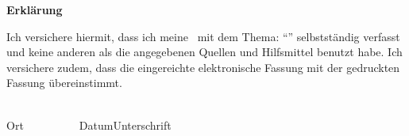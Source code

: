 
\newpage
\thispagestyle{empty}
\begin{framed}
\begin{center}
\Large\bfseries Erklärung
\end{center}
\medskip
\noindent
Ich versichere hiermit, dass ich meine \Was\ mit
dem Thema: \enquote{\Titel} selbstständig verfasst und keine anderen als die angegebenen Quellen und
Hilfsmittel benutzt habe. Ich versichere zudem, dass die eingereichte elektronische Fassung mit der
gedruckten Fassung übereinstimmt.

\vspace{1cm}
\noindent
\underline{\hspace{4.5cm}}\hfill\underline{\hspace{6.15cm}}\\
Ort~~~~~~~~~~Datum\hfill Unterschrift\hspace{4cm}
\end{framed}


\endinput
